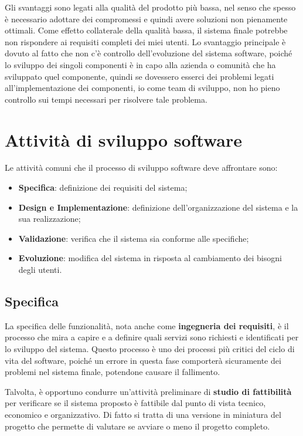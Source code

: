 Gli svantaggi sono legati alla qualità del prodotto più bassa, nel senso che spesso è 
necessario adottare dei compromessi e quindi avere soluzioni non pienamente ottimali.
Come effetto collaterale della qualità bassa, il sistema finale potrebbe non rispondere 
ai requisiti completi dei miei utenti.
Lo svantaggio principale è dovuto al fatto che non c'è controllo dell'evoluzione del 
sistema software, poiché lo sviluppo dei singoli componenti è in capo alla azienda o 
comunità che ha sviluppato quel componente, quindi se dovessero esserci dei problemi 
legati all'implementazione dei componenti, io come team di sviluppo, non ho pieno
controllo sui tempi necessari per risolvere tale problema.

\section{Attività di sviluppo software}
Le attività comuni che il processo di sviluppo software deve affrontare sono:
\begin{itemize}
  \item \textbf{Specifica}: definizione dei requisiti del sistema;
  \item \textbf{Design e Implementazione}: definizione dell'organizzazione del sistema e
  la sua realizzazione;
  \item \textbf{Validazione}: verifica che il sistema sia conforme alle specifiche;
  \item \textbf{Evoluzione}: modifica del sistema in risposta al cambiamento 
  dei bisogni degli utenti.
\end{itemize}
\subsection{Specifica}
La specifica delle funzionalità, nota anche come \textbf{ingegneria dei requisiti},
è il processo che mira a capire e a definire quali servizi sono richiesti e identificati 
per lo sviluppo del sistema. 
Questo processo è uno dei processi più critici del ciclo di vita del software, poiché
un errore in questa fase comporterà sicuramente dei problemi nel sistema finale, potendone 
causare il fallimento. 

Talvolta, è opportuno condurre un'attività preliminare di \textbf{studio di fattibilità}
per verificare se il sistema proposto è fattibile dal punto di vista tecnico, economico
e organizzativo. Di fatto si tratta di una versione in miniatura del progetto che 
permette di valutare se avviare o meno il progetto completo.

